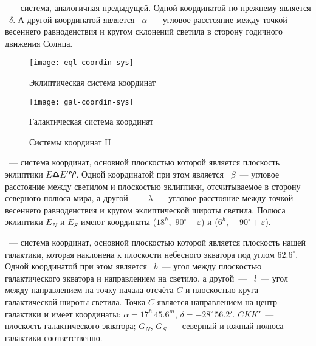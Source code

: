 ~--- система, аналогичная предыдущей. Одной координатой по прежнему является ~$\delta$. А другой координатой является ~$\alpha$~--- угловое расстояние между точкой весеннего равноденствия и кругом склонений светила в сторону годичного движения Солнца.

\begin{figure}[!h]
    \centering
    \begin{subcaptionblock}{0.49\textwidth}
        \texttt{[image: eql-coordin-sys]}
        \caption{Эклиптическая система координат}
    \end{subcaptionblock}
    \hfill
    \begin{subcaptionblock}{0.49\textwidth}
        \texttt{[image: gal-coordin-sys]}
        \caption{Галактическая система координат}
    \end{subcaptionblock}
    \caption{Системы координат II}
\end{figure}
~--- система координат, основной плоскостью которой является плоскость эклиптики $E \libra E' \aries $. Одной координатой при этом является ~$\beta$~--- угловое расстояние между светилом и плоскостью эклиптики, отсчитываемое в сторону северного полюса мира, а другой~--- ~$\lambda$~--- угловое расстояние между точкой весеннего равноденствия и кругом эклиптической широты светила. Полюса эклиптики $E_N$ и $E_S$ имеют координаты ($18^h$,~$90^\circ - \varepsilon$) и ($6^h$,~$-90^\circ + \varepsilon$).

~--- система координат, основной плоскостью которой является плоскость нашей галактики, которая наклонена к плоскости небесного экватора под углом $62.6^\circ$. Одной координатой при этом является ~$b$~--- угол между плоскостью галактического экватора и направлением на светило, а другой~--- ~$l$~--- угол между направлением на точку начала отсчёта $C$ и плоскостью круга галактической широты светила. Точка $C$ является направлением на центр галактики и имеет координаты: $\alpha=17^h\,45.6^m$, $\delta=-28^{\circ}\,56.2'$. $C K K'$~--- плоскость галактического экватора; $G_N$, $G_S$~--- северный и южный полюса галактики соответственно.
